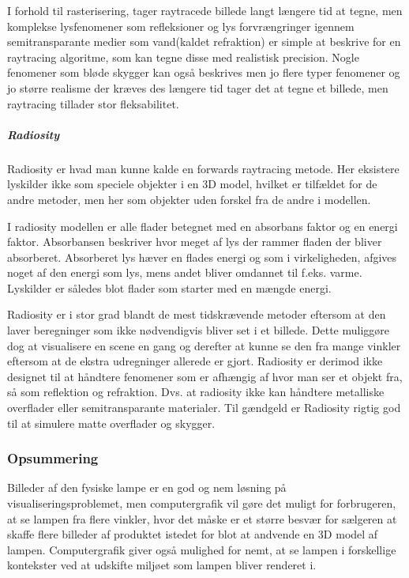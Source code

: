 I forhold til rasterisering, tager raytracede billede langt længere tid at tegne, men komplekse lysfenomener som refleksioner og lys forvrængringer igennem semitransparante medier som vand(kaldet refraktion) er simple at beskrive for en raytracing algoritme, som kan tegne disse med realistisk precision. Nogle fenomener som bløde skygger kan også beskrives men jo flere typer fenomener og jo større realisme der kræves des længere tid tager det at tegne et billede, men raytracing tillader stor fleksabilitet.

\subparagraph{Radiosity \cite{radiosity_by_wpi,radiosity_by_uob}}
Radiosity er hvad man kunne kalde en forwards raytracing metode. Her eksistere lyskilder ikke som speciele objekter i en 3D model, hvilket er tilfældet for de andre metoder, men her som objekter uden forskel fra de andre i modellen.

I radiosity modellen er alle flader betegnet med en absorbans faktor og en energi faktor. Absorbansen beskriver hvor meget af lys der rammer fladen der bliver absorberet. Absorberet lys hæver en flades energi og som i virkeligheden, afgives noget af den energi som lys, mens andet bliver omdannet til f.eks. varme. Lyskilder er således blot flader som starter med en mængde energi.

Radiosity er i stor grad blandt de mest tidskrævende metoder eftersom at den laver beregninger som ikke nødvendigvis bliver set i et billede. Dette muliggøre dog at visualisere en scene en gang og derefter at kunne se den fra mange vinkler eftersom at de ekstra udregninger allerede er gjort. Radiosity er derimod ikke designet til at håndtere fenomener som er afhængig af hvor man ser et objekt fra, så som reflektion og refraktion. Dvs. at radiosity ikke kan håndtere metalliske overflader eller semitransparante materialer. Til gændgeld er Radiosity rigtig god til at simulere matte overflader og skygger.

\subsubsection{Opsummering}
Billeder af den fysiske lampe er en god og nem løsning på visualiseringsproblemet, men computergrafik vil gøre det muligt for forbrugeren, at se lampen fra flere vinkler, hvor det måske er et større besvær for sælgeren at skaffe flere billeder af produktet istedet for blot at andvende en 3D model af lampen. Computergrafik giver også mulighed for nemt, at se lampen i forskellige kontekster ved at udskifte miljøet som lampen bliver renderet i. 

